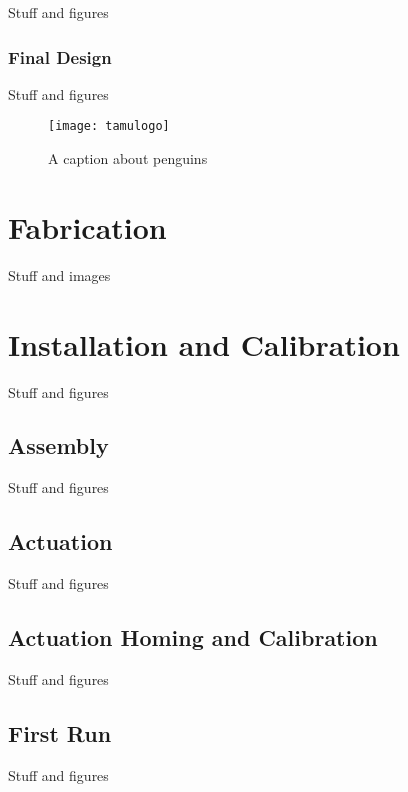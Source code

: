 Stuff and figures

\subsubsection{Final Design}

Stuff and figures

\begin{figure}[ht]
    \centering
    \texttt{[image: tamulogo]}
    \caption{A caption about penguins}
\end{figure}

\section{Fabrication}

Stuff and images

\section{Installation and Calibration}

Stuff and figures

\subsection{Assembly}

Stuff and figures

\subsection{Actuation}

Stuff and figures

\subsection{Actuation Homing and Calibration}

Stuff and figures

\subsection{First Run}

Stuff and figures

